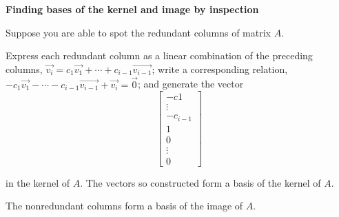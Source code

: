 \par\noindent\textbf{Finding bases of the kernel and image by inspection}
\par\noindent Suppose you are able to spot the redundant columns of matrix $A$.
\par\noindent Express each redundant column as a linear combination of the preceding columns, $\vec{v_{i}}=c_{1}\vec{v_{1}}+\cdots{}+c_{i-1}\vec{v_{i-1}}$; write a corresponding relation, $-c_{1}\vec{v_{1}}-\cdots{}-c_{i-1}\vec{v_{i-1}}+\vec{v_{i}}=\vec{0}$; and generate the vector
\[\left[\begin{array}{c}-c{1}\\ \vdots{} \\ -c_{i-1} \\ 1 \\ 0 \\ \vdots{} \\ 0\end{array}\right]\]
\par\noindent in the kernel of $A$. The vectors so constructed form a basis of the kernel of $A$.
\par\noindent The nonredundant columns form a basis of the image of $A$.
